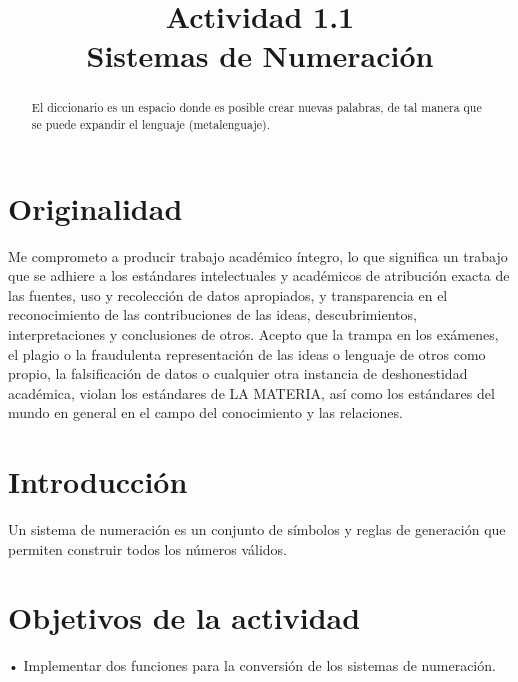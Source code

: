 \documentclass[conference]{IEEEtran}
\begin{document}
\title{Actividad 1.1 \\ Sistemas de Numeración }

\author{
 }
\onecolumn

\maketitle

\begin{abstract}
El diccionario es un espacio donde es posible crear nuevas palabras, de tal manera que se puede expandir el lenguaje (metalenguaje).
\end{abstract}

\section{Originalidad}
Me comprometo a producir trabajo académico íntegro, lo que significa un trabajo que se adhiere a los estándares intelectuales y académicos de atribución exacta de las fuentes, uso y recolección de datos apropiados, y transparencia en el reconocimiento de las contribuciones de las ideas, descubrimientos, interpretaciones y conclusiones de otros.
Acepto que la trampa en los exámenes, el plagio o la fraudulenta representación de las ideas o lenguaje de otros como propio, la falsificación de datos o cualquier otra instancia de deshonestidad académica, violan los estándares de LA MATERIA, así como los estándares del mundo en general en el campo del conocimiento y las relaciones.

\section{Introducción}
\begin{center}
Un sistema de numeración es un conjunto de símbolos y reglas de generación que permiten construir todos los números válidos.
\end{center}

\section{Objetivos de la actividad}
\begin{center}
• Implementar dos funciones para la conversión de los sistemas de numeración.
\end{center}
\end{document}
